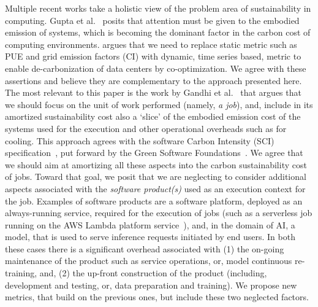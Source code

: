 {{        Multiple recent works take a holistic view of the problem area of sustainability in computing. {Gupta et al.}~\cite{Gupta2020} posits that attention must be given to the embodied emission of systems, which is becoming the dominant factor in the carbon cost of computing environments. \cite{Chien2020} argues that we need to replace static metric such as PUE and grid emission factors (CI) with dynamic, time series based, metric to enable de-carbonization of data centers by co-optimization. We agree with these assertions and believe they are complementary to the approach presented here. The most relevant to this paper is the work by {Gandhi et al.}~\cite{Gandhi2022} that argues that we should focus on the unit of work performed (namely, \textit{a job}), and, include in its amortized sustainability cost also a `slice' of the embodied emission cost of the systems used for the execution and other operational overheads such as for cooling. This approach agrees with the software Carbon Intensity (SCI) specification~\cite{SCI}, put forward by the Green Software Foundations~\cite{GSF}. We agree that we should aim at amortizing all these aspects into the carbon sustainability cost of jobs. Toward that goal, we posit that we are neglecting to consider additional aspects associated with the \textit{software product(s)} used as an execution context for the job. Examples of software products are a software platform, deployed as an always-running service, required for the execution of jobs (such as a serverless job running on the AWS Lambda platform service~\cite{Lambda}), and, in the domain of AI, a model, that is used to serve inference requests initiated by end users. In both these cases there is a significant overhead associated with (1) the on-going maintenance of the product such as service operations, or, model continuous re-training, and, (2) the up-front construction of the product (including, development and testing, or, data preparation and training). We propose new metrics, that build on the previous ones, but include these two neglected factors.

}}
